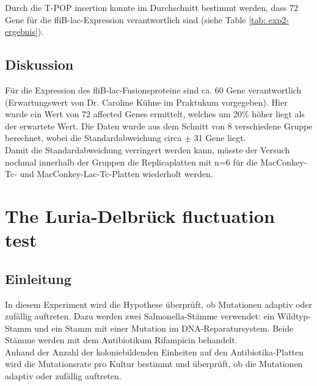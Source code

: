 \documentclass[oneside,10pt,a4paper]{report}
\begin{document}
		Durch die T-POP insertion konnte im Durchschnitt bestimmt werden, dass 72 Gene für die fliB-lac-Expression verantwortlich sind (siehe Table \ref{tab: exp2-ergebnis}).
		\section{Diskussion}
		Für die Expression des fliB-lac-Fusionsproteine sind ca. 60 Gene verantwortlich (Erwartungswert von Dr. Caroline Kühne im Praktukum vorgegeben). Hier wurde ein Wert von 72 affected Genes ermittelt, welches um 20$\%$ höher liegt als der erwartete Wert. Die Daten wurde aus dem Schnitt von 8 verschiedene Gruppe berechnet, wobei die Standardabweichung circa $\pm$ 31 Gene liegt.\\
		Damit die Standardabweichung verringert werden kann, müsste der Versuch nochmal  innerhalb der Gruppen die Replicaplatten mit n=6 für die MacConkey-Tc- und MacConkey-Lac-Tc-Platten wiederholt werden.
		
		

	
	\chapter{The Luria-Delbrück fluctuation test}	
		\section{Einleitung}
	In diesem Experiment wird die Hypothese überprüft, ob Mutationen adaptiv oder zufällig auftreten. Dazu werden zwei Salmonella-Stämme verwendet: ein Wildtyp-Stamm und ein Stamm mit einer Mutation im DNA-Reparatursystem. Beide Stämme werden mit dem Antibiotikum Rifampicin behandelt.\\
	Anhand der Anzahl der koloniebildenden Einheiten auf den Antibiotika-Platten wird die Mutationsrate pro Kultur bestimmt und überprüft, ob die Mutationen adaptiv oder zufällig auftreten.
		
\end{document}
